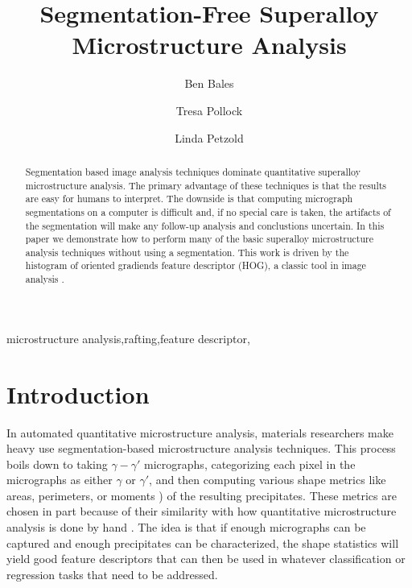 \documentclass[review]{elsarticle}
\date{}
\begin{document}
	\begin{frontmatter}
		\title{Segmentation-Free Superalloy Microstructure Analysis}

		\author[mech]{Ben Bales}
		\author[mat]{Tresa Pollock}
		\author[mech]{Linda Petzold}
		
		\address[mech]{University of California, Department of Mechanical Engineering, Santa Barbara, CA 93106-5070}
		\address[mat]{Materials Department, Engineering II Building, 1355 University of California, Santa Barbara, Santa Barbara, CA 93106-5050}

		\begin{abstract}
		Segmentation based image analysis techniques dominate quantitative superalloy microstructure analysis. The primary advantage of these techniques is that the results are easy for humans to interpret. The downside is that computing micrograph segmentations on a computer is difficult and, if no special care is taken, the artifacts of the segmentation will make any follow-up analysis and conclustions uncertain. In this paper we demonstrate how to perform many of the basic superalloy microstructure analysis techniques without using a segmentation. This work is driven by the histogram of oriented gradiends feature descriptor (HOG), a classic tool in image analysis \cite{gradtex, hog, girsh}.
		\end{abstract}

		\begin{keyword}
			microstructure analysis\sep rafting\sep feature descriptor\sep 
		\end{keyword}
	\end{frontmatter}

	\section{Introduction}
		In automated quantitative microstructure analysis, materials researchers make heavy use segmentation-based microstructure analysis techniques. This process boils down to taking $\gamma-\gamma'$ micrographs, categorizing each pixel in the micrographs as either $\gamma$ or $\gamma'$, and then computing various shape metrics like areas, perimeters, or moments \cite{twoDM, threeDM}) of the resulting precipitates. These metrics are chosen in part because of their similarity with how quantitative microstructure analysis is done by hand \cite{sluytman, underwood}. The idea is that if enough micrographs can be captured and enough precipitates can be characterized, the shape statistics will yield good feature descriptors that can then be used in whatever classification or regression tasks that need to be addressed.
\end{document}
